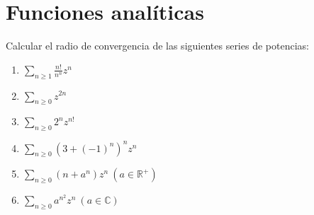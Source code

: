\newpage


\section{Funciones analíticas}

\begin{ejer}
	Calcular el radio de convergencia de las siguientes series de potencias:
	\begin{enumerate}[label=(\alph*)]
		\item $\sum_{n\geq1} \frac{n!}{n^n}z^n$
		\item $\sum_{n\geq 0} z^{2n}$
		\item $\sum_{n\geq 0} 2^nz^{n!}$
		\item $\sum_{n\geq 0} (3+(-1)^n)^nz^n$
		\item $\sum_{n\geq 0} (n+a^n)z^n \ (a\in\mathbb{R}^+)$
		\item $\sum_{n\geq 0} a^{n^2}z^n \ (a\in\mathbb{C})$
	\end{enumerate}
\end{ejer}





